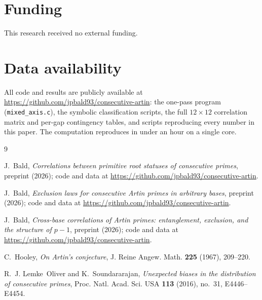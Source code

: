 \documentclass[11pt,reqno]{amsart}
\theoremstyle{plain}
\theoremstyle{definition}
\begin{document}
\section*{Funding}
This research received no external funding.

\section*{Data availability}
All code and results are publicly available at
\url{https://github.com/jpbald93/consecutive-artin}: the one-pass program
(\texttt{mixed\_axis.c}), the symbolic classification scripts, the full
$12 \times 12$ correlation matrix and per-gap contingency tables, and
scripts reproducing every number in this paper. The computation reproduces
in under an hour on a single core.

\begin{thebibliography}{9}

J.~Bald,
\emph{Correlations between primitive root statuses of consecutive primes},
preprint (2026); code and data at
\url{https://github.com/jpbald93/consecutive-artin}.

J.~Bald,
\emph{Exclusion laws for consecutive Artin primes in arbitrary bases},
preprint (2026); code and data at
\url{https://github.com/jpbald93/consecutive-artin}.

J.~Bald,
\emph{Cross-base correlations of Artin primes: entanglement, exclusion, and
the structure of $p-1$},
preprint (2026); code and data at
\url{https://github.com/jpbald93/consecutive-artin}.

C.~Hooley,
\emph{On Artin's conjecture},
J. Reine Angew. Math. \textbf{225} (1967), 209--220.

R.~J. Lemke~Oliver and K.~Soundararajan,
\emph{Unexpected biases in the distribution of consecutive primes},
Proc. Natl. Acad. Sci. USA \textbf{113} (2016), no.~31, E4446--E4454.

\end{thebibliography}
\end{document}
